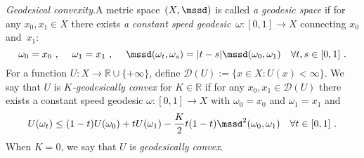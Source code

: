 \documentclass[11pt,letterpaper]{amsart}
\newcommand{\dom}[1]{\mathcal D(#1)}
\newcommand{\diff}{\mathop{}\!\mathrm{d}}
\newcommand{\R}{{\mathbb R}}
\newcommand{\comma}{\,\,\mathrm{,}\;\,}
\newcommand{\fstop}{\,\,\mathrm{.}}
\renewcommand{\1}{\mathbf 1}
\numberwithin{equation}{section}
\theoremstyle{plain}
\theoremstyle{definition}
\theoremstyle{remark}
\renewcommand{\paragraph}[1]{\medskip\emph{#1}.\quad}
\begin{document}
%

\paragraph{Geodesical convexity}A metric space~$(X, \mssd)$ is called {\it a geodesic space} if for any $x_0, x_1 \in X$ there exists {\it a constant speed geodesic}~$\omega:[0,1] \to X$ connecting $x_0$ and~$x_1$:
$$\omega_0=x_0 \comma \quad \omega_1=x_1\comma \quad \mssd(\omega_t, \omega_s)=|t-s|\mssd(\omega_0, \omega_1) \quad \forall t, s \in [0,1]\fstop$$
For a function $U: X \to \R\cup\{+\infty\}$, define $\dom{U}:=\{x \in X: U(x)<\infty\}$. We say that $U$ is {\it $K$-geodesically convex} for $K \in \R$ if for any $x_0, x_1 \in \dom{U}$ there exists a constant speed geodesic $\omega: [0,1] \to X$ with $\omega_0=x_0$ and $\omega_1=x_1$ and 
$$U(\omega_t)\le (1-t)U(\omega_0)+tU(\omega_1)-\frac{K}{2}t(1-t)\mssd^2(\omega_0, \omega_1) \quad \forall t \in [0,1] \fstop$$
When $K=0$, we say that $U$ is {\it geodesically convex}. 
\end{document}
